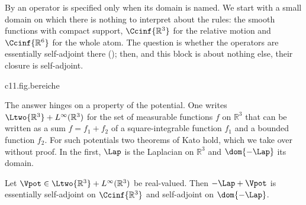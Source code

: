 \begin{fundament}[id=c11.f1,
    titel={Self-adjointness of the Hamiltonians of the hydrogen atom},
    wozu={In the Core text $\op{\HamTot}$ and $\op{\HamRel}$ are rules for differentiable
      functions. Here it is stated on which domains they fix self-adjoint operators, and
      on which theorem this rests.},
    voraussetzung={Core~\ref{c11.s1} and \ref{c11.s2}; the notions of domain and of
      (essentially) self-adjoint from \defref{D16} and \defref{D19}.},
    zurueck={The rules of \defref{D60} and of Theorem~\ref{c11.thm.separation}, started
      on smooth functions with compact support, each fix a self-adjoint operator: their
      closure.}]
  By  an operator is specified only when its domain is named. We start with
  a small domain on which there is nothing to interpret about the rules: the smooth
  functions with compact support, $\Ccinf{\mathbb{R}^3}$ for the relative motion and
  $\Ccinf{\mathbb{R}^6}$ for the whole atom. The question is whether the operators are
  essentially self-adjoint there (); then, and this block is about nothing
  else, their closure is self-adjoint.

  \begin{tpcfigure}{c11.fig.bereiche}
    \caption{The three sets of functions of this block as a diagram: the smooth functions with compact support, the domain $\dom{-\Lap}$ of the Laplacian and the whole space $\Ltwo{\mathbb{R}^3}$. Entered is what Corollary~\ref{c11.cor.relativ} says about $\op{\HamRel}$.}
  \end{tpcfigure}

  The answer hinges on a property of the potential. One writes
  $\Ltwo{\mathbb{R}^3} + L^{\infty}(\mathbb{R}^3)$ for the set of measurable functions
  $f$ on $\mathbb{R}^3$ that can be written as a sum $f = f_1 + f_2$ of a
  square-integrable function $f_1$ and a bounded function $f_2$. For such potentials two
  theorems of Kato hold, which we take over without proof. In the first, $\Lap$ is the
  Laplacian on $\mathbb{R}^3$ and $\dom{-\Lap}$ its domain.

  \begin{theorem}\label{c11.thm.kato15}
    Let $\Vpot \in \Ltwo{\mathbb{R}^3} + L^{\infty}(\mathbb{R}^3)$ be real-valued. Then
    $-\Lap + \Vpot$ is essentially self-adjoint on $\Ccinf{\mathbb{R}^3}$ and
    self-adjoint on $\dom{-\Lap}$.
  \end{theorem}


\end{fundament}
